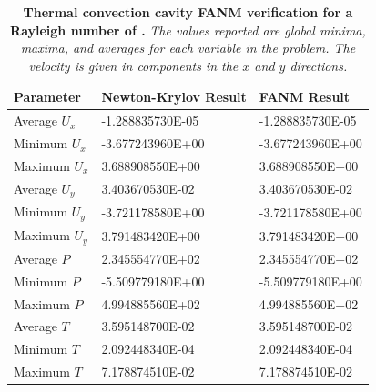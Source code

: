 \begin{table}[h!]
  \begin{center}
    \begin{tabular}{lll}\hline\hline
      \multicolumn{1}{l}{Parameter}& 
      \multicolumn{1}{l}{Newton-Krylov Result}&
      \multicolumn{1}{l}{FANM Result}\\
      \hline
      Average $U_x$ & -1.288835730E-05 & -1.288835730E-05 \\
      Minimum $U_x$ & -3.677243960E+00 & -3.677243960E+00 \\
      Maximum $U_x$ & 3.688908550E+00 & 3.688908550E+00 \\
      \hline
      Average $U_y$ & 3.403670530E-02 & 3.403670530E-02 \\
      Minimum $U_y$ & -3.721178580E+00 & -3.721178580E+00 \\
      Maximum $U_y$ & 3.791483420E+00 & 3.791483420E+00 \\
      \hline
      Average $P$ & 2.345554770E+02 & 2.345554770E+02 \\
      Minimum $P$ & -5.509779180E+00 & -5.509779180E+00 \\
      Maximum $P$ & 4.994885560E+02 & 4.994885560E+02 \\
      \hline
      Average $T$ & 3.595148700E-02 & 3.595148700E-02 \\
      Minimum $T$ & 2.092448340E-04 & 2.092448340E-04 \\
      Maximum $T$ & 7.178874510E-02 & 7.178874510E-02 \\
      \hline\hline
    \end{tabular}
  \end{center}
  \caption{\textbf{Thermal convection cavity FANM verification for a
      Rayleigh number of .} \textit{The values reported are
      global minima, maxima, and averages for each variable in the
      problem. The velocity is given in components in the $x$ and $y$
      directions.}}
  \label{tab:convection_ra1e3_results}
\end{table}

